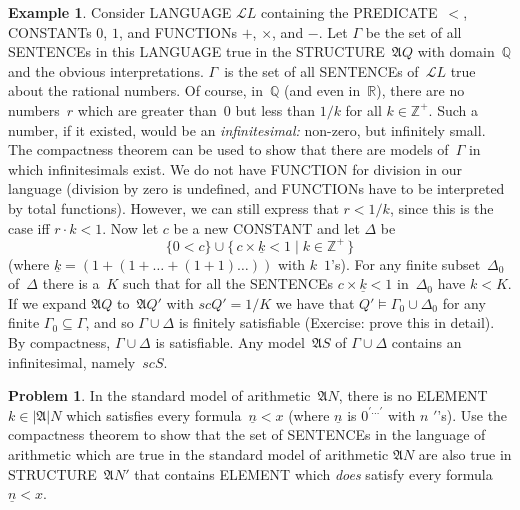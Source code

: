 \documentclass[10pt,a4paper]{article}
\newcommand*{\olup}[1]{\MakeUppercase{#1}}
\theoremstyle{plain}
\theoremstyle{definition}
\newtheorem{ex}[thm]{Example}
\newtheorem{prob}{Problem}[section]
\theoremstyle{remark}
\providecommand{\Obj}{}
\providecommand{\Struct}{\ensuremath{\mathfrak{A}}}
\providecommand{\Domain}{\ensuremath{|\mathfrak{A}|}}
\providecommand{\Assign}{\ensuremath{s}}
\providecommand{\Sat}[2]{\ensuremath{#1 \models #2}}
\providecommand{\Lang}{\ensuremath{\mathcal{L}}}
\providecommand{\num}[1]{\underline{#1}}
\providecommand{\Rat}{\mathbb{Q}}
\providecommand{\Real}{\mathbb{R}}
\providecommand{\PosInt}{\mathbb{Z}^{+}}
\providecommand{\Setabs}[2]{\{\, #1 \mid #2 \,\}}
\begin{document}
{\begin{ex}
Consider \olup{language} $\Lang{L}$ containing the \olup{predicate}~$<$,
\olup{constant}s $\Obj{0}$, $\Obj{1}$, and \olup{function}s $+$, $\times$, and
$-$. Let $\Gamma$ be the set of all \olup{sentence}s in this
\olup{language} true in the \olup{structure}~$\Struct{Q}$ with domain~$\Rat$ and the obvious
interpretations.  $\Gamma$~is the set of all \olup{sentence}s
of~$\Lang{L}$ true about the rational numbers. Of course, in~$\Rat$
(and even in~$\Real$), there are no numbers~$r$ which are greater than~$0$
but less than $1/k$ for all $k \in \PosInt$.  Such a number, if it
existed, would be an \emph{infinitesimal:} non-zero, but infinitely
small.  The compactness theorem can be used to show that there are 
models of~$\Gamma$ in which infinitesimals exist. We do not have 
\olup{function} for division in our language (division by zero is 
undefined, and \olup{function}s have to be interpreted by total functions).
However, we can still express that $r < 1/k$, since this is the case iff
$r \cdot k < 1$. Now let $c$ be a new \olup{constant} and let $\Delta$ be 
\[
\{\Obj{0} < c\}
\cup \Setabs{ c \times \num k < \Obj{1} }{k \in \PosInt}
\]
(where $\num{k} = (\Obj{1} + (\Obj{1} + \dots + (\Obj{1} +
\Obj{1})\dots))$ with $k$~$\Obj{1}$'s). For any finite
subset~$\Delta_0$ of~$\Delta$ there is a~$K$ such that for all the
\olup{sentence}s $c \times \num{k} < \Obj{1}$ in~$\Delta_0$ have $k < K$.
If we expand $\Struct{Q}$ to~$\Struct{Q'}$ with $\Assign{c}{Q'} = 1/K$
we have that $\Sat{Q'}{\Gamma_0 \cup \Delta_0}$ for any finite
$\Gamma_0 \subseteq \Gamma$, and so $\Gamma \cup \Delta$ is finitely
satisfiable (Exercise: prove this in detail). By compactness, $\Gamma
\cup \Delta$ is satisfiable. Any model~$\Struct{S}$ of $\Gamma \cup
\Delta$ contains an infinitesimal, namely~$\Assign{c}{S}$.
\end{ex}
}{}

\begin{prob}
In the standard model of arithmetic~$\Struct{N}$, there is no
\olup{element}~$k \in \Domain{N}$ which satisfies every formula~$\num{n}
< x$ (where $\num{n}$ is $\Obj{0}^{\prime\dots\prime}$ with $n$
$\prime$'s).  Use the compactness theorem to show that the set of
\olup{sentence}s in the language of arithmetic which are true in the standard
model of arithmetic $\Struct{N}$ are also true in
\olup{structure}~$\Struct{N'}$ that contains \olup{element} which
\emph{does} satisfy every formula $\num{n} < x$.
\end{prob}
\tagendprob
\end{document}
